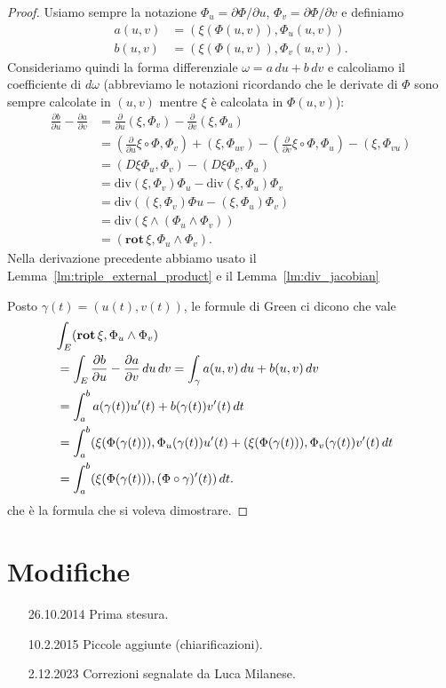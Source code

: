 \documentclass[italian,a4paper]{scrartcl}
\newcommand{\defeq}{=}
\renewcommand{\div}{\mathrm{div}}
\newcommand{\rot}{\mathbf{rot}\,}
\begin{document}
\begin{proof}
Usiamo sempre la notazione $\Phi_u = \partial \Phi/\partial u$,
$\Phi_v = \partial \Phi/\partial v$ e definiamo
\begin{align*}
a(u,v) &\defeq \left(\xi(\Phi(u,v)),\Phi_u(u,v)\right)\\
b(u,v) &\defeq \left(\xi(\Phi(u,v)),\Phi_v(u,v)\right).
\end{align*}
Consideriamo quindi la forma differenziale $\omega = a\, du + b\, dv$
e calcoliamo il coefficiente di $d\omega$ (abbreviamo le notazioni
ricordando che le derivate di $\Phi$ sono sempre calcolate in $(u,v)$
mentre $\xi$ è calcolata in $\Phi(u,v)$):
\begin{align*}
\frac{\partial b}{\partial u} - \frac{\partial a}{\partial v}
& = \frac{\partial}{\partial u}(\xi,\Phi_v) -\frac{\partial}{\partial
  v}(\xi,\Phi_u)\\
& = \left(\frac{\partial}{\partial u} \xi\circ \Phi, \Phi_v\right) +
  (\xi,\Phi_{uv}) - \left(\frac{\partial}{\partial v} \xi \circ \Phi,
  \Phi_u\right)
  -(\xi,\Phi_{vu})\\
& = (D\xi \Phi_u, \Phi_v)-(D\xi \Phi_v,\Phi_u)\\
& = \div (\xi,\Phi_v) \Phi_u - \div (\xi,\Phi_u) \Phi_v\\
& = \div ( (\xi,\Phi_v) \Phi u - (\xi,\Phi_u) \Phi_v)\\
& = \div (\xi \wedge (\Phi_u \wedge \Phi_v))\\
& = (\rot \xi, \Phi_u\wedge \Phi_v).
\end{align*}
Nella derivazione precedente abbiamo usato il
Lemma~\ref{lm:triple_external_product} e il Lemma~\ref{lm:div_jacobian}

Posto $\gamma(t) = (u(t),v(t))$,
le formule di Green ci dicono che vale
\begin{align*}
\lefteqn{\int_E (\rot \xi, \Phi_u \wedge \Phi_v)}\\
 & = \int_E  \frac{\partial b}{\partial u} - \frac{\partial
   a}{\partial v}\, du\,dv
  = \int_{\gamma} a(u,v)\, du + b(u,v)\, dv\\
 & = \int_a^b a(\gamma(t)) u'(t) + b(\gamma(t))v'(t) \, dt\\
 & = \int_a^b (\xi(\Phi(\gamma(t))), \Phi_u(\gamma(t)) u'(t)
     + (\xi(\Phi(\gamma(t))), \Phi_v(\gamma(t)) v'(t)\,
 dt \\
 & = \int_a^b (\xi(\Phi(\gamma(t))), (\Phi\circ\gamma)'(t))\, dt.
\end{align*}
che è la formula che si voleva dimostrare.
\end{proof}

\section*{Modifiche}
\begin{itemize}
\item[26.10.2014] Prima stesura.
\item[10.2.2015] Piccole aggiunte (chiarificazioni).
\item[2.12.2023] Correzioni segnalate da Luca Milanese.
\end{itemize}
\end{document}
